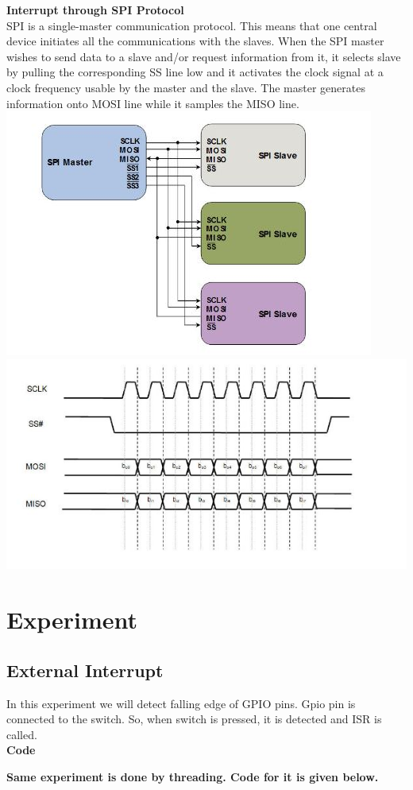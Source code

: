 \documentclass[11pt,a4paper]{article}
\begin{document}
	  \textbf{Interrupt through SPI Protocol} \\
	  
	  SPI is a single-master communication protocol. This means that one central device initiates all the communications with the slaves. When the SPI master wishes to send data to a slave and/or request information from it, it selects slave by pulling the corresponding SS line low and it activates the clock signal at a clock frequency usable by the master and the slave. The master generates information onto MOSI line while it samples the MISO line.\newline
	  \includegraphics[scale=0.8]{SPI.jpg}
	  \vspace{5mm}
	  \includegraphics[scale=0.7]{SPI1.jpg}
	\section{Experiment}
	
	\subsection{External Interrupt}
	In this experiment we will detect falling edge of GPIO pins. Gpio pin is connected to the switch. So, when switch is pressed, it is detected and ISR is called.\\
	\textbf{Code}
	\vspace{0.3cm}
	
	\newpage
	\textbf{Same experiment is done by threading. Code for it is given below.} \\
	\vspace{5mm}
	
\end{document}
